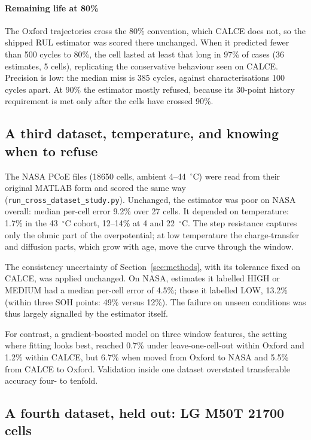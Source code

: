 \documentclass[preprint,12pt,authoryear]{elsarticle}
\begin{document}
\paragraph{Remaining life at 80\%}
The Oxford trajectories cross the 80\% convention, which CALCE does not, so the
shipped RUL estimator was scored there unchanged. When it predicted fewer than
500 cycles to 80\%, the cell lasted at least that long in 97\% of cases (36
estimates, 5 cells), replicating the conservative behaviour seen on CALCE.
Precision is low: the median miss is 385 cycles, against characterisations 100
cycles apart. At 90\% the estimator mostly refused, because its 30-point
history requirement is met only after the cells have crossed 90\%.

\subsection{A third dataset, temperature, and knowing when to refuse}
\label{sec:res-xds}

The NASA PCoE files (18650 cells, ambient 4--44~$^\circ$C) were read from
their original MATLAB form and scored the same way
(\texttt{run\_cross\_dataset\_study.py}). Unchanged, the estimator was poor on
NASA overall: median per-cell error 9.2\% over 27 cells. It depended on
temperature: 1.7\% in the 43~$^\circ$C cohort, 12--14\% at 4 and
22~$^\circ$C. The step resistance captures only the ohmic part of the
overpotential; at low temperature the charge-transfer and diffusion parts,
which grow with age, move the curve through the window.

The consistency uncertainty of Section~\ref{sec:methods}, with its tolerance
fixed on CALCE, was applied unchanged. On NASA, estimates it labelled HIGH or
MEDIUM had a median per-cell error of 4.5\%; those it labelled LOW, 13.2\%
(within three SOH points: 49\% versus 12\%). The failure on unseen conditions
was thus largely signalled by the estimator itself.

For contrast, a gradient-boosted model on three window features, the setting
where fitting looks best, reached 0.7\% under leave-one-cell-out within
Oxford and 1.2\% within CALCE, but 6.7\% when moved from Oxford to NASA and
5.5\% from CALCE to Oxford. Validation inside one dataset overstated
transferable accuracy four- to tenfold.

\subsection{A fourth dataset, held out: LG M50T 21700 cells}
\label{sec:res-m50t}
\end{document}
